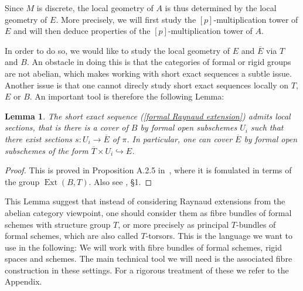 \documentclass[10pt,oneside]{amsart}
\newtheorem{lemma}[theorem]{Lemma}
\theoremstyle{definition}
\begin{document}
	Since $M$ is discrete, the local geometry of $A$ is thus determined by the local geometry of $E$. More precisely, we will first study the $[p]$-multiplication tower of $E$ and will then deduce properties of the $[p]$-multiplication tower of $A$.
	
	In order to do so, we would like to study the local geometry of $E$ and $\overline{E}$ via $T$ and $B$. An obstacle in doing this is that the categories of formal or rigid groups are not abelian, which makes working with short exact sequences a subtle issue. Another issue is that one cannot direcly study short exact sequences locally on $T$, $E$ or $B$. An important tool is therefore the following Lemma:

	\begin{lemma}\label{formal Raynaud sequence is locally split}
		The short exact sequence (\ref{formal Raynaud extension}) admits local sections, that is there is a cover of $B$ by formal open subschemes $U_i$ such that there exist sections $s:U_i\rightarrow \overline{E}$ of $\pi$. In particular, one can cover $\overline{E}$ by formal open subschemes of the form $\overline{T}\times U_i\hookrightarrow E$.
	\end{lemma}
	\begin{proof}
		This is proved in Proposition A.2.5 in~\cite{rigid geometry of curves}, where it is fomulated in terms of the group $\operatorname{Ext}(B,T)$. Also see \cite{BL}, \S 1.
	\end{proof}
	
	This Lemma suggest that instead of considering Raynaud extensions from the abelian category viewpoint, one should consider them as fibre bundles of formal schemes with structure group $T$, or more precisely as principal $T$-bundles of formal schemes, which are also called $T$-torsors. This is the language we want to use in the following: We will work with fibre bundles of formal schemes, rigid spaces and schemes. The main technical tool we will need is the associated fibre construction in these settings. For a rigorous  treatment of these we refer to the Appendix.
	
\end{document}

